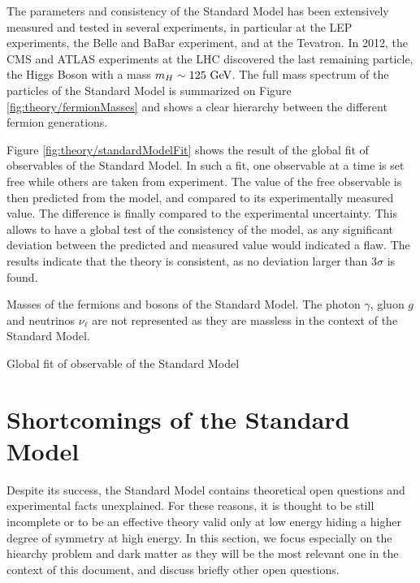     The parameters and consistency of the Standard
    Model has been extensively measured and tested in several experiments, in particular
    at the LEP experiments, the Belle and BaBar experiment, and at the Tevatron. In 2012,
    the CMS and ATLAS experiments at the LHC discovered the last remaining particle, the
    Higgs Boson with a mass $m_H \sim 125~\text{GeV}$. The full mass spectrum of the particles
    of the Standard Model is summarized on Figure \ref{fig:theory/fermionMasses} and
    shows a clear hierarchy between the different fermion generations.

    Figure \ref{fig:theory/standardModelFit} shows the result of the global fit of
    observables of the Standard Model. In such a fit, one observable at a time is set free
    while others are taken from experiment. The value of the free observable is then
    predicted from the model, and compared to its experimentally measured value. The
    difference is finally compared to the experimental uncertainty. This allows to have a
    global test of the consistency of the model, as any significant deviation between the
    predicted and measured value would indicated a flaw. The results indicate that the theory
    is consistent, as no deviation larger than 3$\sigma$ is found.

                 {Masses of the fermions and bosons of the Standard Model. The photon
                 $\gamma$, gluon $g$ and neutrinos $\nu_\ell$ are not represented as they
                 are massless in the context of the Standard Model.}

                  {Global fit of observable of the Standard Model}

    \section{Shortcomings of the Standard Model}

    Despite its success, the Standard Model contains theoretical open questions and
    experimental facts unexplained. For these reasons, it is thought to be still incomplete
    or to be an effective theory valid only at low energy hiding a higher
    degree of symmetry at high energy. In this section, we focus especially on the hiearchy
    problem and dark matter as they will be the most relevant one in the context of this
    document, and discuss briefly other open questions.

